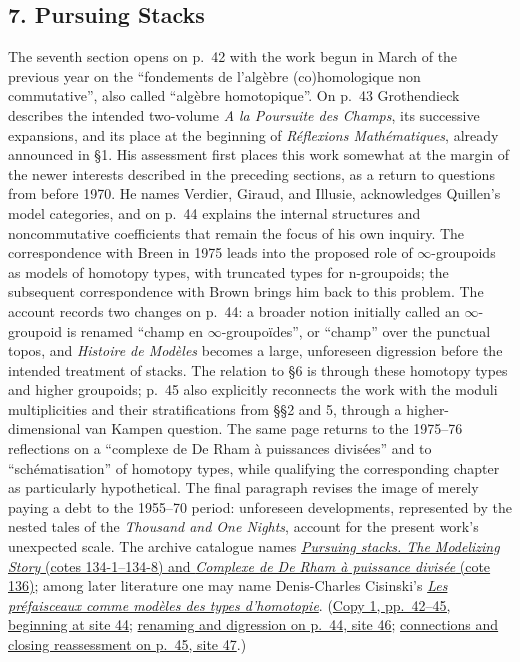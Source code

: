 \subsection*{7. Pursuing Stacks}
The seventh section opens on p.~42 with the work begun in March of the
previous year on the ``fondements de l'algèbre (co)homologique non
commutative'', also called ``algèbre homotopique''. On p.~43 Grothendieck
describes the intended two-volume \emph{A la Poursuite des Champs}, its
successive expansions, and its place at the beginning of
\emph{Réflexions Mathématiques}, already announced in \S1. His assessment
first places this work somewhat at the margin of the newer interests
described in the preceding sections, as a return to questions from before
1970. He names Verdier, Giraud, and Illusie, acknowledges Quillen's model
categories, and on p.~44 explains the internal structures and
noncommutative coefficients that remain the focus of his own inquiry.
The correspondence with Breen in 1975 leads into the proposed role of
$\infty$-groupoids as models of homotopy types, with truncated types for
n-groupoids; the subsequent correspondence with Brown brings him back
to this problem. The account records two changes on p.~44: a broader
notion initially called an $\infty$-groupoid is renamed ``champ en
$\infty$-groupoïdes'', or ``champ'' over the punctual topos, and
\emph{Histoire de Modèles} becomes a large, unforeseen digression before
the intended treatment of stacks. The relation to \S6 is through these
homotopy types and higher groupoids; p.~45 also explicitly reconnects the
work with the moduli multiplicities and their stratifications from
\S\S2 and 5, through a higher-dimensional van Kampen question. The same
page returns to the 1975--76 reflections on a ``complexe de De Rham à
puissances divisées'' and to ``schématisation'' of homotopy types, while
qualifying the corresponding chapter as particularly hypothetical.
The final paragraph revises the image of merely paying a debt to the
1955--70 period: unforeseen developments, represented by the nested tales
of the \emph{Thousand and One Nights}, account for the present work's
unexpected scale. The archive catalogue names
\href{https://grothendieck.umontpellier.fr/archives-grothendieck/}{\emph{Pursuing stacks. The Modelizing Story} (cotes 134-1--134-8) and \emph{Complexe de De Rham à puissance divisée} (cote 136)};
among later literature one may name Denis-Charles Cisinski's
\href{https://smf.emath.fr/publications/les-prefaisceaux-comme-modeles-des-types-dhomotopie}{\emph{Les préfaisceaux comme modèles des types d'homotopie}}.
(\href{https://grothendieck.umontpellier.fr/web/viewer.html?file=../119.pdf\#page=45}{Copy 1, pp.~42--45, beginning at site 44};
\href{https://grothendieck.umontpellier.fr/web/viewer.html?file=../119.pdf\#page=47}{renaming and digression on p.~44, site 46};
\href{https://grothendieck.umontpellier.fr/web/viewer.html?file=../119.pdf\#page=48}{connections and closing reassessment on p.~45, site 47}.)
